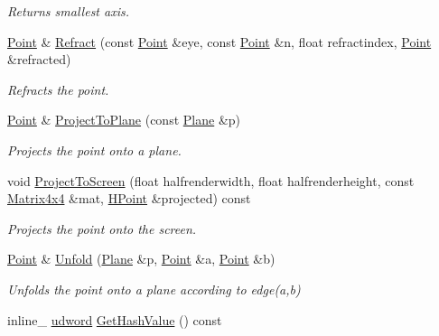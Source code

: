 \begin{DoxyCompactItemize}
\begin{DoxyCompactList}\small\item\em Returns smallest axis. \end{DoxyCompactList}\item 
\hyperlink{classPoint}{Point} \& \hyperlink{classPoint_ad0845cc8ea15deee042fdda02ad42b71}{Refract} (const \hyperlink{classPoint}{Point} \&eye, const \hyperlink{classPoint}{Point} \&n, float refractindex, \hyperlink{classPoint}{Point} \&refracted)\hypertarget{classPoint_ad0845cc8ea15deee042fdda02ad42b71}{}\label{classPoint_ad0845cc8ea15deee042fdda02ad42b71}

\begin{DoxyCompactList}\small\item\em Refracts the point. \end{DoxyCompactList}\item 
\hyperlink{classPoint}{Point} \& \hyperlink{classPoint_ac71c611d6cfe6d7a87ce3bbb57508ebb}{Project\+To\+Plane} (const \hyperlink{classPlane}{Plane} \&p)\hypertarget{classPoint_ac71c611d6cfe6d7a87ce3bbb57508ebb}{}\label{classPoint_ac71c611d6cfe6d7a87ce3bbb57508ebb}

\begin{DoxyCompactList}\small\item\em Projects the point onto a plane. \end{DoxyCompactList}\item 
void \hyperlink{classPoint_a0069c972353d11800870127a19536b8c}{Project\+To\+Screen} (float halfrenderwidth, float halfrenderheight, const \hyperlink{classMatrix4x4}{Matrix4x4} \&mat, \hyperlink{classHPoint}{H\+Point} \&projected) const \hypertarget{classPoint_a0069c972353d11800870127a19536b8c}{}\label{classPoint_a0069c972353d11800870127a19536b8c}

\begin{DoxyCompactList}\small\item\em Projects the point onto the screen. \end{DoxyCompactList}\item 
\hyperlink{classPoint}{Point} \& \hyperlink{classPoint_af5a596b6264585a391e2cefb5167f39c}{Unfold} (\hyperlink{classPlane}{Plane} \&p, \hyperlink{classPoint}{Point} \&a, \hyperlink{classPoint}{Point} \&b)\hypertarget{classPoint_af5a596b6264585a391e2cefb5167f39c}{}\label{classPoint_af5a596b6264585a391e2cefb5167f39c}

\begin{DoxyCompactList}\small\item\em Unfolds the point onto a plane according to edge(a,b) \end{DoxyCompactList}\item 
inline\+\_\+ \hyperlink{IceTypes_8h_a44c6f1920ba5551225fb534f9d1a1733}{udword} \hyperlink{classPoint_a932b34defe629f8e3b34cac5680c62ca}{Get\+Hash\+Value} () const \hypertarget{classPoint_a932b34defe629f8e3b34cac5680c62ca}{}\label{classPoint_a932b34defe629f8e3b34cac5680c62ca}


\end{DoxyCompactItemize}
